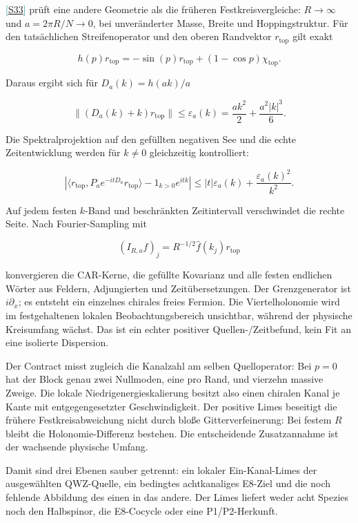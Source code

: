 \documentclass[11pt,a4paper,oneside,parskip=half,headings=normal,numbers=noenddot,bibliography=totoc]{scrreprt}
\newcommand{\src}[1]{\textcolor{teal}{\small[\hyperref[s:#1]{S#1}]}}
\begin{document}
\src{33} prüft eine andere Geometrie als die früheren
Festkreisvergleiche: \(R\to\infty\) und \(a=2\pi R/N\to0\), bei unveränderter
Masse, Breite und Hoppingstruktur. Für den tatsächlichen Streifenoperator und
den oberen Randvektor \(r_\mathrm{top}\) gilt exakt

\[
 h(p)r_\mathrm{top}=-\sin(p)r_\mathrm{top}+(1-\cos p)\chi_\mathrm{top}.
\]

Daraus ergibt sich für \(D_a(k)=h(ak)/a\)

\[
 \|(D_a(k)+k)r_\mathrm{top}\|
 \le \varepsilon_a(k)
 =\frac{a k^2}{2}+\frac{a^2|k|^3}{6}.
\]

Die Spektralprojektion auf den gefüllten negativen See und die echte
Zeitentwicklung werden für $k\ne0$ gleichzeitig kontrolliert:

\[
 \left|\langle r_\mathrm{top},P_a e^{-itD_a}r_\mathrm{top}\rangle
 -1_{k>0}e^{itk}\right|
 \le |t|\varepsilon_a(k)+\frac{\varepsilon_a(k)^2}{k^2}.
\]

Auf jedem festen \(k\)-Band und beschränkten Zeitintervall verschwindet die
rechte Seite. Nach Fourier-Sampling mit

\[
 (I_{R,a}f)_j=R^{-1/2}\widehat f(k_j)r_\mathrm{top}
\]

konvergieren die CAR-Kerne, die gefüllte Kovarianz und alle festen endlichen
Wörter aus Feldern, Adjungierten und Zeitübersetzungen. Der Grenzgenerator ist
\(i\partial_x\); es entsteht ein einzelnes chirales freies Fermion. Die
Viertelholonomie wird im festgehaltenen lokalen Beobachtungsbereich unsichtbar, während der physische Kreisumfang wächst. Das ist ein echter positiver Quellen-/Zeitbefund,
kein Fit an eine isolierte Dispersion.

Der Contract misst zugleich die Kanalzahl am selben Quelloperator: Bei
$p=0$ hat der Block genau zwei Nullmoden, eine pro Rand, und vierzehn
massive Zweige. Die lokale Niedrigenergieskalierung besitzt also einen
chiralen Kanal je Kante mit entgegengesetzter Geschwindigkeit. Der positive
Limes beseitigt die frühere Festkreisabweichung nicht durch bloße
Gitterverfeinerung: Bei festem \(R\) bleibt die Holonomie-Differenz bestehen.
Die entscheidende Zusatzannahme ist der wachsende physische Umfang.

Damit sind drei Ebenen sauber getrennt: ein lokaler Ein-Kanal-Limes der
ausgewählten QWZ-Quelle, ein bedingtes achtkanaliges E8-Ziel und die noch
fehlende Abbildung des einen in das andere. Der Limes liefert weder acht
Spezies noch den Halbspinor, die E8-Cocycle oder eine P1/P2-Herkunft.
\end{document}
